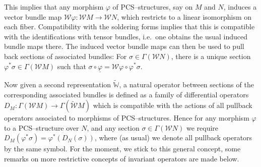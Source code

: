 \documentclass[12pt,a4paper]{amsart}
\def\Bbb{\mathbb}
\def\Cal{\mathcal}
\let\phi\varphi
\renewcommand{\o}{\circ}
\newcommand{\ph}{\phi}
\newcommand{\si}{\sigma}
\newcommand{\Ga}{\Gamma}
\newcommand{\tcw}{{\tilde{\Cal W}}}
\newcommand{\tbw}{{\tilde{\Bbb W}}}
\numberwithin{theorem}{section}
\theoremstyle{definition}
\theoremstyle{remark}
\begin{document}
This implies that any morphism $\ph$ of PCS--structures, say on $M$
and $N$, induces a vector bundle map $\Cal W\ph:\Cal WM\to\Cal WN$,
which restricts to a linear isomorphism on each fiber. Compatibility
with the soldering forms implies that this is compatible with the
identifications with tensor bundles, i.e.~one obtains the usual induced
bundle maps there. The induced vector bundle maps can then be used to
pull back sections of associated bundles: For $\si\in\Ga(\Cal WN)$,
there is a unique section $\ph^*\si\in\Ga(\Cal WM)$ such that $\si\o
\underline{\ph}=\Cal W\ph\o \ph^*\si$. 

Now given a second representation $\tbw$, a natural operator between
sections of the corresponding associated bundles is defined as a
family of differential operators $D_M:\Ga(\Cal WM)\to\Ga(\tcw M)$
which is compatible with the actions of all pullback operators
associated to morphisms of PCS--structures. Hence for any morphism
$\ph$ to a PCS--structure over $N$, and any section $\si\in\Ga(\Cal
WN)$ we require $D_M(\ph^*\si)=\ph^*(D_N(\si))$, where (as usual) we
denote all pullback operators by the same symbol. For the moment, we
stick to this general concept, some remarks on more restrictive
concepts of invariant operators are made below. 
\end{document}

